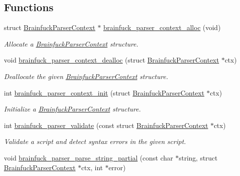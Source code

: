 \subsection*{Functions}
\begin{DoxyCompactItemize}
\item 
struct \hyperlink{structBrainfuckParserContext}{Brainfuck\+Parser\+Context} $\ast$ \hyperlink{group__parser_ga76d2c8f57c25c5be7d3f8212a4cefd45}{brainfuck\+\_\+parser\+\_\+context\+\_\+alloc} (void)
\begin{DoxyCompactList}\small\item\em Allocate a \hyperlink{structBrainfuckParserContext}{Brainfuck\+Parser\+Context} structure. \end{DoxyCompactList}\item 
void \hyperlink{group__parser_ga562074cdae7765d92eb4609bf564512b}{brainfuck\+\_\+parser\+\_\+context\+\_\+dealloc} (struct \hyperlink{structBrainfuckParserContext}{Brainfuck\+Parser\+Context} $\ast$ctx)
\begin{DoxyCompactList}\small\item\em Deallocate the given \hyperlink{structBrainfuckParserContext}{Brainfuck\+Parser\+Context} structure. \end{DoxyCompactList}\item 
int \hyperlink{group__parser_gaf20f40db8fd5915b6175ba8a0d16c5e0}{brainfuck\+\_\+parser\+\_\+context\+\_\+init} (struct \hyperlink{structBrainfuckParserContext}{Brainfuck\+Parser\+Context} $\ast$ctx)
\begin{DoxyCompactList}\small\item\em Initialize a \hyperlink{structBrainfuckParserContext}{Brainfuck\+Parser\+Context} structure. \end{DoxyCompactList}\item 
int \hyperlink{group__parser_gad5e9a2747a62b6ad48df440a251ac655}{brainfuck\+\_\+parser\+\_\+validate} (const struct \hyperlink{structBrainfuckParserContext}{Brainfuck\+Parser\+Context} $\ast$ctx)
\begin{DoxyCompactList}\small\item\em Validate a script and detect syntax errors in the given script. \end{DoxyCompactList}\item 
void \hyperlink{group__parser_ga8ae33803127e1c48ad3cddecaf381a77}{brainfuck\+\_\+parser\+\_\+parse\+\_\+string\+\_\+partial} (const char $\ast$string, struct \hyperlink{structBrainfuckParserContext}{Brainfuck\+Parser\+Context} $\ast$ctx, int $\ast$error)

\end{DoxyCompactItemize}

